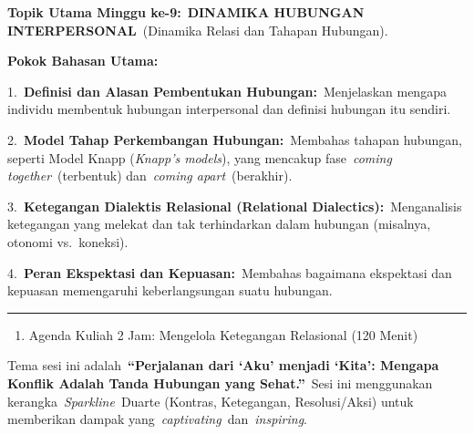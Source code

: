 \documentclass[
  letterpaper,
  DIV=11,
  numbers=noendperiod]{scrreprt}
\providecommand{\tightlist}{%
  \setlength{\itemsep}{0pt}\setlength{\parskip}{0pt}}
\begin{document}
\textbf{Topik Utama Minggu ke-9:}~\textbf{DINAMIKA HUBUNGAN
INTERPERSONAL}~(Dinamika Relasi dan Tahapan Hubungan).

\textbf{Pokok Bahasan Utama:}

1.~\textbf{Definisi dan Alasan Pembentukan Hubungan:}~Menjelaskan
mengapa individu membentuk hubungan interpersonal dan definisi hubungan
itu sendiri.

2.~\textbf{Model Tahap Perkembangan Hubungan:}~Membahas tahapan
hubungan, seperti Model Knapp (\emph{Knapp's models}), yang mencakup
fase~\emph{coming together}~(terbentuk) dan~\emph{coming
apart}~(berakhir).

3.~\textbf{Ketegangan Dialektis Relasional (Relational
Dialectics):}~Menganalisis ketegangan yang melekat dan tak terhindarkan
dalam hubungan (misalnya, otonomi vs.~koneksi).

4.~\textbf{Peran Ekspektasi dan Kepuasan:}~Membahas bagaimana ekspektasi
dan kepuasan memengaruhi keberlangsungan suatu hubungan.

\begin{center}\rule{0.5\linewidth}{0.5pt}\end{center}

\begin{enumerate}
\def\labelenumi{\arabic{enumi}.}
\setcounter{enumi}{1}
\tightlist
\item
  Agenda Kuliah 2 Jam: Mengelola Ketegangan Relasional (120 Menit)
\end{enumerate}

Tema sesi ini adalah~\textbf{``Perjalanan dari `Aku' menjadi `Kita':
Mengapa Konflik Adalah Tanda Hubungan yang Sehat.''}~Sesi ini
menggunakan kerangka~\emph{Sparkline}~Duarte (Kontras, Ketegangan,
Resolusi/Aksi) untuk memberikan dampak
yang~\emph{captivating}~dan~\emph{inspiring}.
\end{document}
